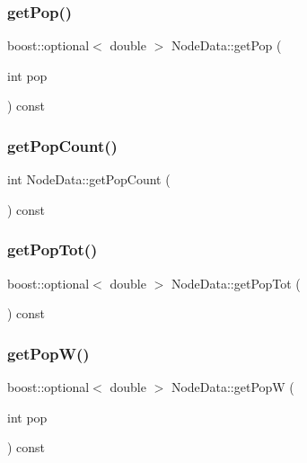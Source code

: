 \mbox{\label{class_node_data_a3847bd4ee9c48cd7f7ef0352c5eee5fd}} 
\subsubsection{\texorpdfstring{getPop()}{getPop()}}
{\footnotesize\ttfamily boost\+::optional$<$ double $>$ Node\+Data\+::get\+Pop (\begin{DoxyParamCaption}\item[{int}]{pop }\end{DoxyParamCaption}) const}

\mbox{\label{class_node_data_af5fd5c15f587de431fbe7241c60392c2}} 
\subsubsection{\texorpdfstring{getPopCount()}{getPopCount()}}
{\footnotesize\ttfamily int Node\+Data\+::get\+Pop\+Count (\begin{DoxyParamCaption}{ }\end{DoxyParamCaption}) const}

\mbox{\label{class_node_data_ab2c09a7a14aeb151ad1cabb8d009ea92}} 
\subsubsection{\texorpdfstring{getPopTot()}{getPopTot()}}
{\footnotesize\ttfamily boost\+::optional$<$ double $>$ Node\+Data\+::get\+Pop\+Tot (\begin{DoxyParamCaption}{ }\end{DoxyParamCaption}) const}

\mbox{\label{class_node_data_ac2d689c2bbe1a915b88be7cd7c12cf63}} 
\subsubsection{\texorpdfstring{getPopW()}{getPopW()}}
{\footnotesize\ttfamily boost\+::optional$<$ double $>$ Node\+Data\+::get\+PopW (\begin{DoxyParamCaption}\item[{int}]{pop }\end{DoxyParamCaption}) const}

